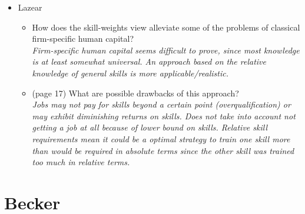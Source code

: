 \documentclass[12pt,a4paper]{article}
\begin{document}
\begin{itemize}
	\item Lazear
	  \begin{itemize}
	    \item How does the skill-weights view alleviate some of the problems of classical firm-specific human capital? \\
	      \emph{Firm-specific human capital seems difficult to prove, since most knowledge is at least somewhat universal. An approach based on the relative knowledge of general skills is more applicable/realistic.}
	    \item (page 17) What are possible drawbacks of this approach? \\
	      \emph{Jobs may not pay for skills beyond a certain point (overqualification) or may exhibit diminishing returns on skills. Does not take into account not getting a job at all because of lower bound on skills. Relative skill requirements mean it could be a optimal strategy to train one skill more than would be required in absolute terms since the other skill was trained too much in relative terms.}

	  \end{itemize}
	

  \end{itemize}
  \section{Becker} %
  \label{prt:Becker}

\end{document}
